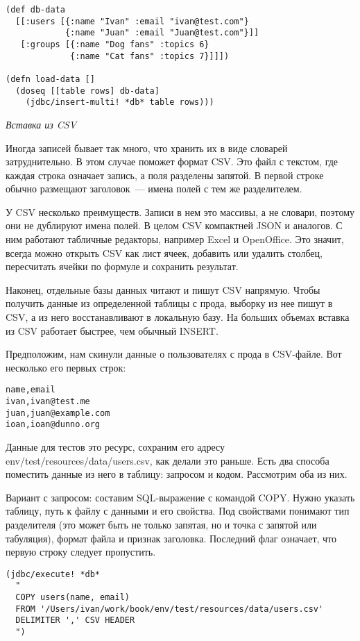 \begin{verbatim}
(def db-data
  [[:users [{:name "Ivan" :email "ivan@test.com"}
            {:name "Juan" :email "Juan@test.com"}]]
   [:groups [{:name "Dog fans" :topics 6}
             {:name "Cat fans" :topics 7}]]])

(defn load-data []
  (doseq [[table rows] db-data]
    (jdbc/insert-multi! *db* table rows)))
\end{verbatim}

\emph{Вставка из CSV}

Иногда записей бывает так много, что хранить их в виде словарей
затруднительно. В этом случае поможет формат CSV. Это файл с текстом, где каждая
строка означает запись, а поля разделены запятой. В первой строке обычно
размещают заголовок~--- имена полей с тем же разделителем.

У CSV несколько преимуществ. Записи в нем это массивы, а не словари, поэтому они
не дублируют имена полей. В целом CSV компактней JSON и аналогов. С ним работают
табличные редакторы, например Excel и OpenOffice. Это значит, всегда можно
открыть CSV как лист ячеек, добавить или удалить столбец, пересчитать ячейки по
формуле и сохранить результат.

Наконец, отдельные базы данных читают и пишут CSV напрямую. Чтобы получить
данные из определенной таблицы с прода, выборку из нее пишут в CSV, а из него
восстанавливают в локальную базу. На больших объемах вставка из CSV работает
быстрее, чем обычный INSERT.

Предположим, нам скинули данные о пользователях с прода в CSV-файле. Вот
несколько его первых строк:

\begin{verbatim}
name,email
ivan,ivan@test.me
juan,juan@example.com
ioan,ioan@dunno.org
\end{verbatim}

Данные для тестов это ресурс, сохраним его адресу
env/test/resources/data/users.csv, как делали это раньше. Есть два способа
поместить данные из него в таблицу: запросом и кодом. Рассмотрим оба из них.

Вариант с запросом: составим SQL-выражение с командой COPY. Нужно указать
таблицу, путь к файлу с данными и его свойства. Под свойствами понимают тип
разделителя (это может быть не только запятая, но и точка с запятой или
табуляция), формат файла и признак заголовка. Последний флаг означает, что
первую строку следует пропустить.

\begin{verbatim}
(jdbc/execute! *db*
  "
  COPY users(name, email)
  FROM '/Users/ivan/work/book/env/test/resources/data/users.csv'
  DELIMITER ',' CSV HEADER
  ")
\end{verbatim}

